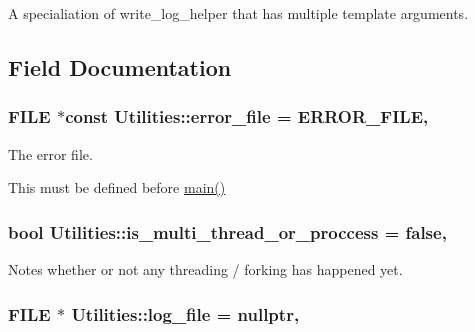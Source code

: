 A specialiation of write\+\_\+log\+\_\+helper that has multiple template arguments. 



\subsection{Field Documentation}
\subsubsection[{\texorpdfstring{error\+\_\+file}{error_file}}]{\setlength{\rightskip}{0pt plus 5cm}F\+I\+LE $\ast$const Utilities\+::error\+\_\+file = {\bf E\+R\+R\+O\+R\+\_\+\+F\+I\+LE}\hspace{0.3cm}{\ttfamily [static]}, {\ttfamily [private]}}\hypertarget{class_utilities_afc3b1cf892b76cede8fa87bfdd17533c}{}\label{class_utilities_afc3b1cf892b76cede8fa87bfdd17533c}


The error file. 

This must be defined before \hyperlink{shadow__stack_8cpp_a0ddf1224851353fc92bfbff6f499fa97}{main()} 
\subsubsection[{\texorpdfstring{is\+\_\+multi\+\_\+thread\+\_\+or\+\_\+proccess}{is_multi_thread_or_proccess}}]{\setlength{\rightskip}{0pt plus 5cm}bool Utilities\+::is\+\_\+multi\+\_\+thread\+\_\+or\+\_\+proccess = false\hspace{0.3cm}{\ttfamily [static]}, {\ttfamily [private]}}\hypertarget{class_utilities_af893d8dcd5bb1ba3fc72fc108536bcbc}{}\label{class_utilities_af893d8dcd5bb1ba3fc72fc108536bcbc}


Notes whether or not any threading / forking has happened yet. 

\subsubsection[{\texorpdfstring{log\+\_\+file}{log_file}}]{\setlength{\rightskip}{0pt plus 5cm}F\+I\+LE $\ast$ Utilities\+::log\+\_\+file = nullptr\hspace{0.3cm}{\ttfamily [static]}, {\ttfamily [private]}}\hypertarget{class_utilities_a63ce9d08b6459cd102bb368a274aca07}{}\label{class_utilities_a63ce9d08b6459cd102bb368a274aca07}


